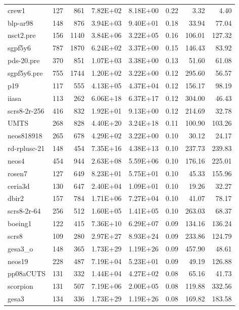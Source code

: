 \documentclass[10pt]{article}
\begin{document}
\begin{longtable}{|l|r|r|r|r|r|r|r|}
crew1	&	127	&	861	&	7.82E+02	&	8.18E+00	&	0.22	&	3.32	&	4.40	\\
blp-ar98	&	148	&	876	&	3.94E+03	&	9.40E+01	&	0.18	&	33.94	&	77.04	\\
nsct2.pre	&	156	&	1140	&	3.84E+06	&	3.22E+05	&	0.16	&	106.01	&	127.32	\\
sgpf5y6	&	787	&	1870	&	6.24E+02	&	3.37E+00	&	0.15	&	146.43	&	83.92	\\
pds-20.pre	&	370	&	851	&	1.07E+03	&	3.38E+00	&	0.13	&	51.60	&	61.08	\\
sgpf5y6.pre	&	755	&	1744	&	1.20E+02	&	3.22E+00	&	0.12	&	295.60	&	56.57	\\
p19	&	117	&	555	&	4.13E+05	&	4.37E+04	&	0.12	&	156.17	&	98.19	\\
iiasa	&	113	&	262	&	6.06E+18	&	6.37E+17	&	0.12	&	304.00	&	46.43	\\
scrs8-2r-256	&	416	&	832	&	1.92E+01	&	9.13E+00	&	0.12	&	214.69	&	32.78	\\
UMTS	&	268	&	828	&	4.40E+20	&	3.24E+18	&	0.11	&	100.90	&	103.26	\\
neos818918	&	265	&	678	&	4.29E+02	&	3.22E+00	&	0.10	&	30.12	&	24.17	\\
rd-rplusc-21	&	148	&	454	&	7.35E+16	&	4.38E+13	&	0.10	&	237.73	&	239.83	\\
neos4	&	454	&	944	&	2.63E+08	&	5.59E+06	&	0.10	&	176.16	&	225.01	\\
rosen7	&	127	&	649	&	8.23E+01	&	5.75E+01	&	0.10	&	45.33	&	155.96	\\
ceria3d	&	130	&	647	&	2.40E+04	&	1.09E+01	&	0.10	&	19.26	&	32.27	\\
dbir2	&	157	&	784	&	1.71E+06	&	7.27E+04	&	0.10	&	41.07	&	78.17	\\
scrs8-2r-64	&	256	&	512	&	1.60E+05	&	1.41E+05	&	0.10	&	263.03	&	68.37	\\
boeing1	&	122	&	415	&	7.36E+10	&	6.29E+07	&	0.09	&	134.16	&	136.24	\\
scrs8	&	109	&	280	&	2.97E+27	&	8.93E+24	&	0.09	&	233.86	&	124.79	\\
gesa3\_o	&	148	&	365	&	1.73E+29	&	1.19E+26	&	0.09	&	457.90	&	48.61	\\
neos19	&	228	&	487	&	7.19E+04	&	5.23E+01	&	0.09	&	49.19	&	126.88	\\
pp08aCUTS	&	131	&	332	&	1.44E+04	&	4.27E+02	&	0.08	&	65.16	&	41.73	\\
scorpion	&	131	&	507	&	7.19E+06	&	2.00E+05	&	0.08	&	119.88	&	332.56	\\
gesa3	&	134	&	336	&	1.73E+29	&	1.19E+26	&	0.08	&	169.82	&	183.58	\\

\end{longtable}
\end{document}
